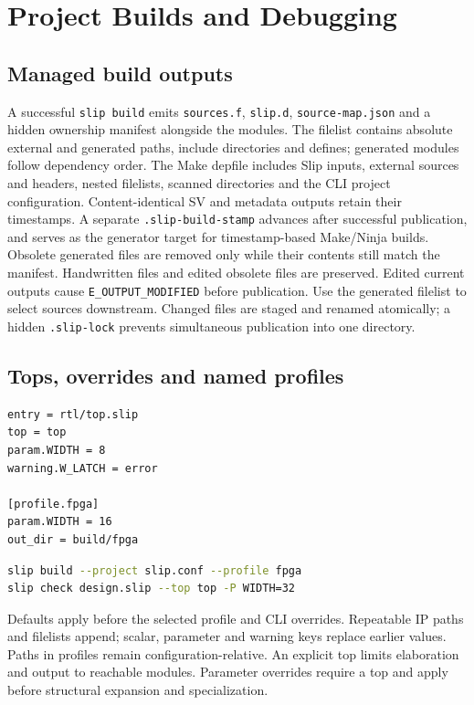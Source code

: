 \documentclass[lang=en,11pt]{elegantbook}
\newcommand{\code}[1]{\texttt{#1}}
\begin{document}

\chapter{Project Builds and Debugging}

\section{Managed build outputs}
A successful \code{slip build} emits \code{sources.f}, \code{slip.d},
\code{source-map.json} and a hidden ownership manifest alongside the modules.
The filelist contains absolute external and generated paths, include directories
and defines; generated modules follow dependency order. The Make depfile includes
Slip inputs, external sources and headers, nested filelists, scanned directories
and the CLI project configuration.
Content-identical SV and metadata outputs retain their timestamps. A separate
\code{.slip-build-stamp} advances after successful publication, and serves as the
generator target for timestamp-based Make/Ninja builds. Obsolete generated files are
removed only while their contents still match the manifest. Handwritten files
and edited obsolete files are preserved. Edited current outputs cause
\code{E\_OUTPUT\_MODIFIED} before publication. Use the generated filelist to select
sources downstream. Changed files are staged and renamed atomically; a hidden
\code{.slip-lock} prevents simultaneous publication into one directory.

\section{Tops, overrides and named profiles}
\begin{lstlisting}[language={}]
entry = rtl/top.slip
top = top
param.WIDTH = 8
warning.W_LATCH = error

[profile.fpga]
param.WIDTH = 16
out_dir = build/fpga
\end{lstlisting}
\begin{lstlisting}[language=bash]
slip build --project slip.conf --profile fpga
slip check design.slip --top top -P WIDTH=32
\end{lstlisting}
Defaults apply before the selected profile and CLI overrides. Repeatable IP paths
and filelists append; scalar, parameter and warning keys replace earlier values.
Paths in profiles remain configuration-relative. An explicit top limits
elaboration and output to reachable modules. Parameter overrides require a top
and apply before structural expansion and specialization.
\end{document}
